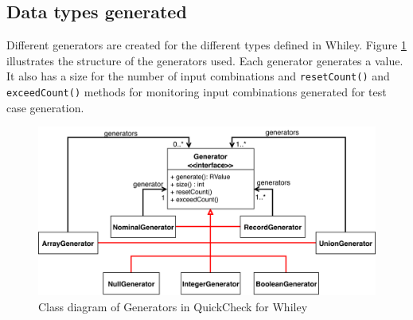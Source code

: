 \subsection{Data types generated}
Different generators are created for the different types defined in Whiley. 
Figure \ref{fig:qc-generators} illustrates the structure of the generators used.
Each generator generates a value. It also has a size for the number of input combinations and \texttt{resetCount()} and \texttt{exceedCount()} methods for monitoring input combinations generated for test case generation.
 
\begin{figure}
	\caption{Class diagram of Generators in QuickCheck for Whiley}
	\label{fig:qc-generators}
	\includegraphics[width=\textwidth]{qc-generators}
	\centering
\end{figure}

